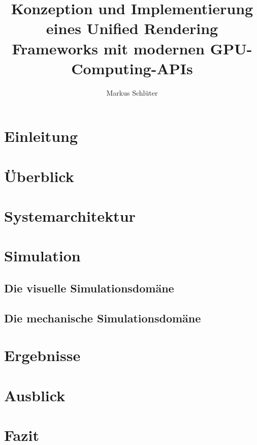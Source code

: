 \documentclass[m,twoside,intern,palatino]{cgBA}
\begin{document}
\author{Markus Schl{\"u}ter}
\title{Konzeption und Implementierung eines Unified Rendering Frameworks mit modernen GPU-Computing-APIs}








\maketitle
\clearpage 




\listoftodos		%
\tableofcontents
\clearpage         	%




\section{Einleitung}
	
	
\section{Überblick}
	

\section{Systemarchitektur}
	
	
\section{Simulation}
	\subsection{Die visuelle Simulationsdomäne}
			
	\subsection{Die mechanische Simulationsdomäne}
		


\section{Ergebnisse}

	

\section{Ausblick}

	

\section{Fazit}

	



\end{document}
